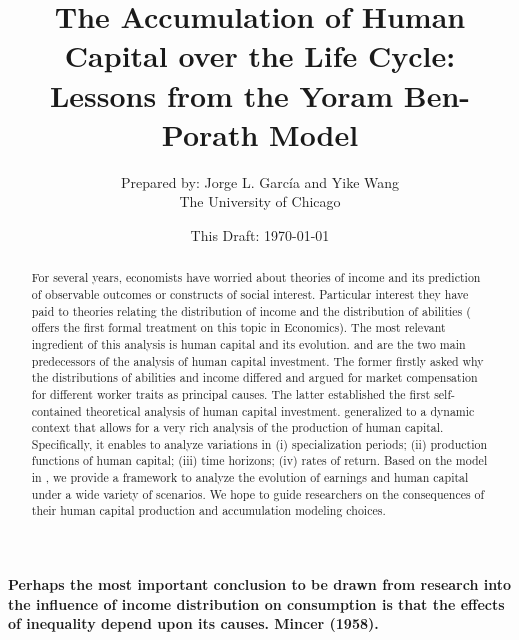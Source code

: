 \documentclass[12pt]{article}
\begin{document}
\title{The Accumulation of Human Capital over the Life Cycle: Lessons from the Yoram Ben-Porath Model}
\author{Prepared by: Jorge L. Garc\'{i}a and Yike Wang \\ The University of Chicago}
\date{This Draft: \today}
\maketitle

\begin{flushright}
\textbf{Perhaps the most important conclusion to be drawn from research into the influence of income distribution on consumption is that the effects of inequality depend upon its causes. Mincer (1958).}
\end{flushright}


\begin{abstract}
\noindent For several years, economists have worried about theories of income and its prediction of observable outcomes or constructs of social interest. Particular interest they have paid to theories relating the distribution of income and the distribution of abilities (\citet{staehle1943ability} offers the first formal treatment on this topic in Economics). The most relevant ingredient of this analysis is human capital and its evolution. \citet{mincer1958investment} and \citet{becker1962investment} are the two main predecessors of the analysis of human capital investment. The former firstly asked why the distributions of abilities and income differed and argued for market compensation for different worker traits as principal causes. The latter established the first self-contained theoretical analysis of human capital investment. \citet{ben1967production} generalized \citet{becker1962investment} to a dynamic context that allows for a very rich analysis of the production of human capital. Specifically, it enables to analyze variations in (i) specialization periods; (ii) production functions of human capital; (iii) time horizons; (iv) rates of return. Based on the model in \citet{ben1967production}, we provide a framework to analyze the evolution of earnings and human capital under a wide variety of scenarios. We hope to guide researchers on the consequences of their human capital production and accumulation modeling choices.
\end{abstract}



\clearpage


\end{document}
